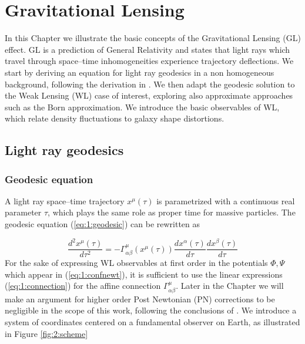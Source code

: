 
\chapter{Gravitational Lensing}
 \thispagestyle{plain}
\setlength{\parindent}{10mm}
\label{chp:2}

In this Chapter we illustrate the basic concepts of the Gravitational Lensing (GL) effect. GL is a prediction of General Relativity and states that light rays which travel through space--time inhomogeneities experience trajectory deflections. We start by deriving an equation for light ray geodesics in a non homogeneous background, following the derivation in \citep{Dodelson-C11}. We then adapt the geodesic solution to the Weak Lensing (WL) case of interest, exploring also approximate approaches such as the Born approximation. We introduce the basic observables of WL, which relate density fluctuations to galaxy shape distortions. 

\section{Light ray geodesics}

\subsection{Geodesic equation} 

A light ray space--time trajectory $x^\mu(\tau)$ is parametrized with a continuous real parameter $\tau$, which plays the same role as proper time for massive particles. The geodesic equation (\ref{eq:1:geodesic}) can be rewritten as 

\begin{equation}
\label{eq:2:geodesic}
\frac{d^2 x^\mu(\tau)}{d\tau^2} = -\Gamma_{\alpha\beta}^\mu(x^\mu(\tau)) \frac{d x^\alpha(\tau)}{d\tau}\frac{d x^\beta(\tau)}{d\tau}
\end{equation}
%
For the sake of expressing WL observables at first order in the potentials $\Phi,\Psi$ which appear in (\ref{eq:1:confnewt}), it is sufficient to use the linear expressions (\ref{eq:1:connection}) for the affine connection $\Gamma^\mu_{\alpha\beta}$. Later in the Chapter we will make an argument for higher order Post Newtonian (PN) corrections to be negligible in the scope of this work, following the conclusions of \citep{PNLensing}. We introduce a system of coordinates centered on a fundamental observer on Earth, as illustrated in Figure \ref{fig:2:scheme}

